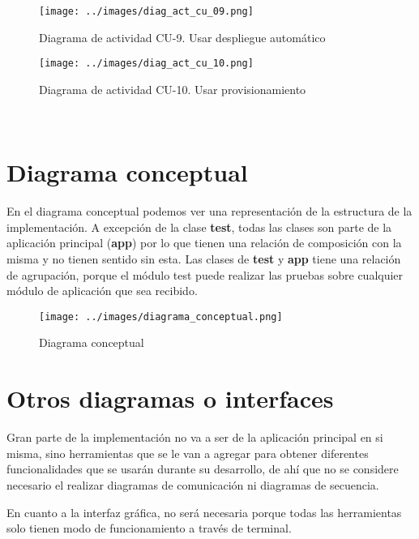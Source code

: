 \begin{figure}[!ht]
  \begin{center}
  \texttt{[image: ../images/diag\_act\_cu\_09.png]}
  \caption{Diagrama de actividad CU-9. Usar despliegue automático}
  \label{fig:diag_act_cu_09}
  \end{center}
\end{figure}

\begin{figure}[!ht]
  \begin{center}
  \texttt{[image: ../images/diag\_act\_cu\_10.png]}
  \caption{Diagrama de actividad CU-10. Usar provisionamiento}
  \label{fig:diag_act_cu_10}
  \end{center}
\end{figure}

\newpage
\
\newpage
\
\newpage
\
\newpage
\
\newpage
\
\newpage
\
\newpage
\
\newpage
\
\newpage

\section{Diagrama conceptual}

En el diagrama conceptual podemos ver una representación de la estructura de la implementación. A excepción de la clase \textbf{test}, todas las clases son parte de la aplicación principal (\textbf{app}) por lo que tienen una relación de composición con la misma y no tienen sentido sin esta. Las clases de \textbf{test} y \textbf{app} tiene una relación de agrupación, porque el módulo test puede realizar las pruebas sobre cualquier módulo de aplicación que sea recibido.

\begin{figure}[!ht]
  \begin{center}
  \texttt{[image: ../images/diagrama\_conceptual.png]}
  \caption{Diagrama conceptual}
  \label{fig:diagrama_conceptual}
  \end{center}
\end{figure}

\section{Otros diagramas o interfaces}

Gran parte de la implementación no va a ser de la aplicación principal en si misma, sino herramientas que se le van a agregar para obtener diferentes funcionalidades que se usarán durante su desarrollo, de ahí que no se considere necesario el realizar diagramas de comunicación ni diagramas de secuencia.

\bigskip
En cuanto a la interfaz gráfica, no será necesaria porque todas las herramientas solo tienen modo de funcionamiento a través de terminal.